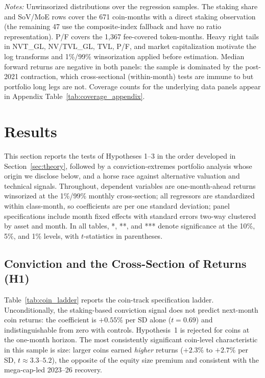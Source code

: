\documentclass[12pt]{article}
\begin{document}
\begin{table}[ht]
\parbox{0.95\linewidth}{\footnotesize
\textit{Notes:} Unwinsorized distributions over the regression samples. The staking
share and SoV/MoE rows cover the 671 coin-months with a direct staking observation
(the remaining 47 use the composite-index fallback and have no ratio representation).
P/F covers the 1,367 fee-covered token-months. Heavy right tails in NVT\_GL, NV/TVL\_GL,
TVL, P/F, and market capitalization motivate the log transforms and 1\%/99\%
winsorization applied before estimation. Median forward returns are negative in both
panels: the sample is dominated by the post-2021 contraction, which cross-sectional
(within-month) tests are immune to but portfolio long legs are not. Coverage counts for
the underlying data panels appear in Appendix Table~\ref{tab:coverage_appendix}.}
\end{table}

\section{Results}
\label{sec:results}

This section reports the tests of Hypotheses 1--3 in the order developed in
Section~\ref{sec:theory}, followed by a conviction-extremes portfolio analysis whose
origin we disclose below, and a horse race against alternative valuation and technical
signals. Throughout, dependent variables are one-month-ahead returns winsorized at the
1\%/99\% monthly cross-section; all regressors are standardized within class-month, so
coefficients are per one standard deviation; panel specifications include month fixed
effects with standard errors two-way clustered by asset and month. In all tables,
*, **, and *** denote significance at the 10\%, 5\%, and 1\% levels, with
$t$-statistics in parentheses.

\subsection{Conviction and the Cross-Section of Returns (H1)}
\label{sec:results_h1}

Table~\ref{tab:coin_ladder} reports the coin-track specification ladder.
Unconditionally, the staking-based conviction signal does not predict next-month coin
returns: the coefficient is $+0.55\%$ per SD alone ($t=0.69$) and indistinguishable from
zero with controls. Hypothesis~1 is rejected for coins at the one-month horizon. The
most consistently significant coin-level characteristic in this sample is size: larger
coins earned \textit{higher} returns ($+2.3\%$ to $+2.7\%$ per SD, $t \approx 3.3$--$5.2$),
the opposite of the equity size premium and consistent with the mega-cap-led 2023--26
recovery.
\end{document}
